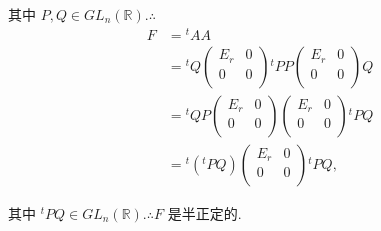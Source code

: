 \documentclass[color=black,device=normal,lang=cn,mode=geye]{elegantnote}
\begin{document}
\begin{solution}
    其中 $P,Q\in GL_n(\mathbb{R}).\therefore$
    \begin{align*}
        F & ={}^tAA \\
        & ={}^tQ\begin{pmatrix}
            E_r & 0 \\
            0 & 0 \\
        \end{pmatrix}{}^tPP\begin{pmatrix}
            E_r & 0 \\
            0 & 0 \\
        \end{pmatrix}Q \\
        & ={}^tQP\begin{pmatrix}
            E_r & 0 \\
            0 & 0 \\
        \end{pmatrix}\begin{pmatrix}
            E_r & 0 \\
            0 & 0 \\
        \end{pmatrix}{}^tPQ \\
        & ={}^t({}^tPQ)\begin{pmatrix}
            E_r & 0 \\
            0 & 0 \\
        \end{pmatrix}{}^tPQ,
    \end{align*}

    其中 ${}^tPQ\in GL_n(\mathbb{R}).\therefore F$ 是半正定的.
\end{solution}

    
\end{document}
